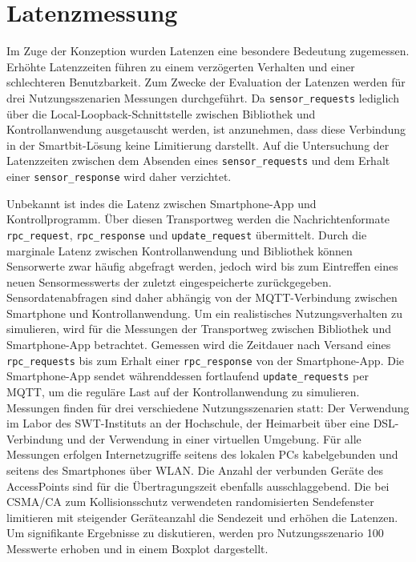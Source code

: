 \documentclass[11pt,a4paper]{report}
\begin{document}
\section{Latenzmessung}
Im Zuge der Konzeption wurden Latenzen eine besondere Bedeutung zugemessen.
Erhöhte Latenzzeiten führen zu einem verzögerten Verhalten und einer schlechteren Benutzbarkeit.
Zum Zwecke der Evaluation der Latenzen werden für drei Nutzungsszenarien Messungen durchgeführt.
Da \texttt{sensor\_requests} lediglich über die Local-Loopback-Schnittstelle zwischen Bibliothek und Kontrollanwendung ausgetauscht werden, ist anzunehmen, dass diese Verbindung in der Smartbit-Lösung keine Limitierung darstellt.
Auf die Untersuchung der Latenzzeiten zwischen dem Absenden eines \texttt{sensor\_requests} und dem Erhalt einer \texttt{sensor\_response} wird daher verzichtet.

Unbekannt ist indes die Latenz zwischen Smartphone-App und Kontrollprogramm.
Über diesen Transportweg werden die Nachrichtenformate \texttt{rpc\_request}, \texttt{rpc\_re\-sponse} und \texttt{update\_request} übermittelt.
Durch die marginale Latenz zwischen Kontrollanwendung und Bibliothek können Sensorwerte zwar häufig abgefragt werden, jedoch wird bis zum Eintreffen eines neuen Sensormesswerts der zuletzt eingespeicherte zurückgegeben.
Sensordatenabfragen sind daher abhängig von der MQTT-Verbindung zwischen Smartphone und Kontrollanwendung.
Um ein realistisches Nutzungsverhalten zu simulieren, wird für die Messungen der Transportweg zwischen Bibliothek und Smartphone-App betrachtet.
Gemessen wird die Zeitdauer nach Versand eines \texttt{rpc\_requests} bis zum Erhalt einer \texttt{rpc\_response} von der Smartphone-App.
Die Smartphone-App sendet währenddessen fortlaufend \texttt{update\_requests} per MQTT, um die reguläre Last auf der Kontrollanwendung zu simulieren.
Messungen finden für drei verschiedene Nutzungsszenarien statt: Der Verwendung im Labor des SWT-Instituts an der Hochschule, der Heimarbeit über eine DSL-Verbindung und der Verwendung in einer virtuellen Umgebung.
Für alle Messungen erfolgen Internetzugriffe seitens des lokalen PCs kabelgebunden und seitens des Smartphones über WLAN.
Die Anzahl der verbunden Geräte des AccessPoints sind für die Übertragungszeit ebenfalls ausschlaggebend.
Die bei CSMA/CA zum Kollisionsschutz verwendeten randomisierten Sendefenster limitieren mit steigender Geräteanzahl die Sendezeit und erhöhen die Latenzen.
Um signifikante Ergebnisse zu diskutieren, werden pro Nutzungsszenario 100 Messwerte erhoben und in einem Boxplot dargestellt.
\end{document}
